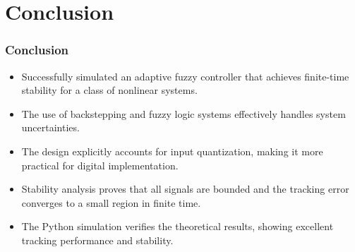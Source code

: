 \documentclass[18p]{beamer}
\begin{document}
\section{Conclusion}
\begin{frame}
	\frametitle{Conclusion}
	\begin{itemize}
		\item<1,6> Successfully simulated an adaptive fuzzy controller that achieves finite-time stability for a class of nonlinear systems.
		\item<2,6> The use of backstepping and fuzzy logic systems effectively handles system uncertainties.
		\item<3,6> The design explicitly accounts for input quantization, making it more practical for digital implementation.
		\item<4,6> Stability analysis proves that all signals are bounded and the tracking error converges to a small region in finite time.
		\item<5,6> The Python simulation verifies the theoretical results, showing excellent tracking performance and stability.
	\end{itemize}
\end{frame}



\ThankYouFrame
\end{document}
